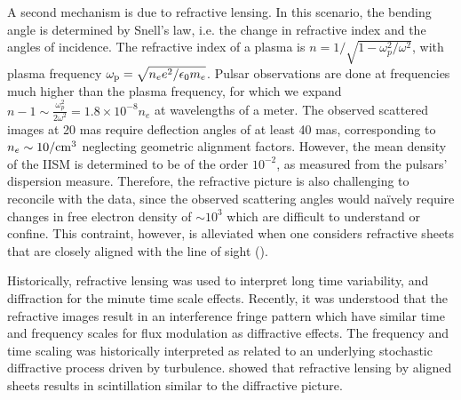 \documentclass[useAMS,usenatbib]{mn2e}
\begin{document}
A second mechanism is due to refractive lensing.  In this scenario,
the bending angle is determined by Snell's law, i.e. the change in
refractive index and the angles of incidence.  The refractive index of
a plasma is $n=1/\sqrt{1-\omega_p^2/\omega^2}$, with plasma frequency
$\omega_{\rm p}=\sqrt{n_e e^2/\epsilon_{0}m_e}$.  Pulsar observations
are done at frequencies much higher than the plasma frequency, for which
we expand $n-1 \sim \frac{\omega_p^2}{2 \omega^2} = 1.8\times 10^{-8}
n_e$ at wavelengths of a meter.  The observed scattered images at 20
mas require deflection 
angles of at least 40 mas, corresponding to $n_e \sim 10/{\rm cm}^3$ neglecting
geometric alignment factors.  However, the mean density of the IISM is
determined to be
of the order $10^{-2}$, as measured  from the pulsars' dispersion measure.
Therefore, the refractive picture is  also challenging to reconcile with the data, since the observed
scattering angles would na\"ively require changes in free electron
density of $\sim 10^3$ 
which are difficult to understand or confine. This contraint, however, is alleviated
when one considers refractive sheets that are closely aligned with the line of sight
(\cite{2006ApJ...640L.159G}).

Historically, refractive lensing was used to interpret long time
variability, and diffraction for the minute time scale
effects. Recently, it was understood that the refractive images result
in an interference fringe pattern\citep{2004MNRAS.354...43W} which have
similar time and frequency scales for flux modulation as diffractive
effects.  The frequency and time scaling was historically interpreted
as related to an underlying stochastic diffractive process driven by
turbulence.
\cite{2006ApJ...640L.159G} showed that refractive lensing by aligned
sheets  results in
scintillation similar to the diffractive picture.




\end{document}
